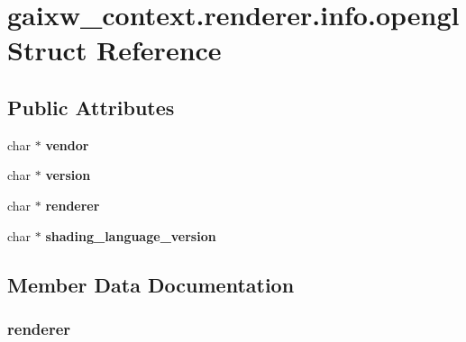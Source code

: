 \hypertarget{structgaixw__context_8renderer_8info_8opengl}{}\section{gaixw\+\_\+context.\+renderer.\+info.\+opengl Struct Reference}
\label{structgaixw__context_8renderer_8info_8opengl}
\subsection*{Public Attributes}
\begin{DoxyCompactItemize}
\item 
\mbox{\label{structgaixw__context_8renderer_8info_8opengl_a7c3613dba5171cb6027c67835dd3b9d4}} 
char $\ast$ {\bfseries vendor}
\item 
\mbox{\label{structgaixw__context_8renderer_8info_8opengl_a2af72f100c356273d46284f6fd1dfc08}} 
char $\ast$ {\bfseries version}
\item 
\mbox{\label{structgaixw__context_8renderer_8info_8opengl_ac341cf643ee747767cf1536ef6690fc4}} 
char $\ast$ {\bfseries renderer}
\item 
\mbox{\label{structgaixw__context_8renderer_8info_8opengl_aa7fa15ce9f364c932b4689af1032de9d}} 
char $\ast$ {\bfseries shading\+\_\+language\+\_\+version}
\end{DoxyCompactItemize}


\subsection{Member Data Documentation}
\mbox{\label{structgaixw__context_8renderer_8info_8opengl_ac341cf643ee747767cf1536ef6690fc4}} 
\subsubsection{\texorpdfstring{renderer}{renderer}}
{\footnotesize\ttfamily }


